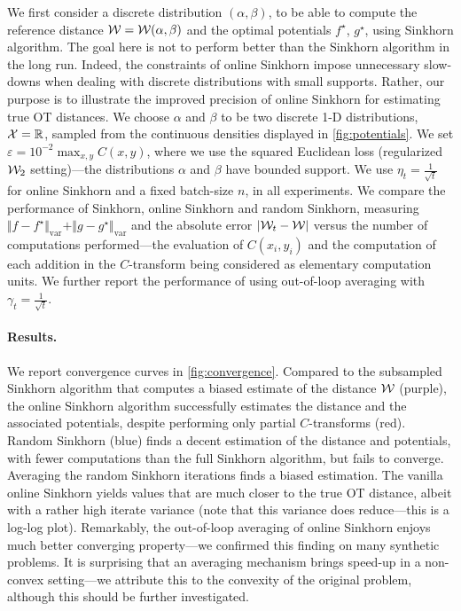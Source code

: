 We first consider a discrete distribution $(\alpha, \beta)$, to be able to
compute the reference distance $\mathcal{W} = \mathcal{W}(\alpha, \beta)$ and the optimal
potentials $f^\star$, $g^\star$, using Sinkhorn algorithm. The goal here is not
to perform better than the Sinkhorn algorithm in the long run. Indeed, the
constraints of online Sinkhorn impose unnecessary slow-downs when dealing with
 discrete distributions with small supports. Rather, our purpose is to illustrate the improved
precision of online Sinkhorn for estimating true OT distances. We choose $\alpha$ and $\beta$ to be two
discrete 1-D distributions, $\mathcal{X}=\mathbb{R}$, sampled from the continuous densities
displayed in
\autoref{fig:potentials}. We set $\varepsilon = 10^{-2} \max_{x,y}
C(x,y)$, where we use the squared Euclidean loss (regularized $\mathcal{W}_2$
setting)---the distributions $\alpha$ and $\beta$ have bounded support. We use
$\eta_t = \frac{1}{\sqrt{t}}$ for online Sinkhorn and a fixed batch-size $n$, in
all experiments. We compare the performance of Sinkhorn, online Sinkhorn and
random Sinkhorn, measuring $\Vert f - f^\star \Vert_{\text{var}} + \Vert g -
g^\star \Vert_{\text{var}}$ and the absolute error $| \mathcal{W}_t - \mathcal{W} |$ versus the
number of computations performed---the evaluation of $C(x_i, y_i)$ and the
computation of each addition in the $C$-transform being considered as elementary
computation units. We further report the performance of using out-of-loop
averaging with $\gamma_t = \frac{1}{\sqrt{t}}$.

\paragraph{Results.} We report convergence curves in \autoref{fig:convergence}.
Compared to the subsampled Sinkhorn algorithm that computes a biased estimate of
the distance $\mathcal{W}$ (purple), the online Sinkhorn algorithm successfully
estimates the distance and the associated potentials, despite performing only
partial $C$-transforms (red). Random Sinkhorn (blue) finds a decent estimation
of the distance and potentials, with fewer computations than the full Sinkhorn
algorithm, but fails to converge. Averaging the random Sinkhorn iterations finds
a biased estimation. The vanilla online Sinkhorn yields values that are much
closer to the true OT distance, albeit with a rather high iterate variance (note
that this variance does reduce---this is a log-log plot). Remarkably, the
out-of-loop averaging of online Sinkhorn enjoys much better converging
property---we confirmed this finding on many synthetic problems. It is
surprising that an averaging mechanism brings speed-up in a non-convex
setting---we attribute this to the convexity of the original problem, although
this should be further investigated.

